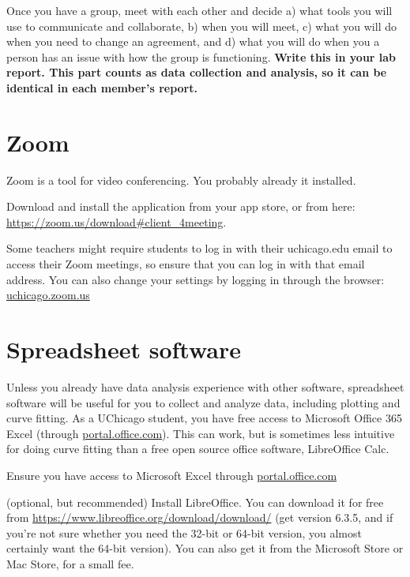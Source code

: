 \begin{steps}
	\item Once you have a group, meet with each other and decide a) what tools you will use to communicate and collaborate, b) when you will meet, c) what you will do when you need to change an agreement, and d) what you will do when you a person has an issue with how the group is functioning. \textbf{Write this in your lab report. This part counts as data collection and analysis, so it can be identical in each member's report.}
\end{steps}

\section{Zoom}

Zoom is a tool for video conferencing. You probably already it installed.

\begin{steps}
	\item Download and install the application from your app store, or from here: \url{https://zoom.us/download\#client_4meeting}.
	
	\item Some teachers might require students to log in with their uchicago.edu email to access their Zoom meetings, so ensure that you can log in with that email address. You can also change your settings by logging in through the browser: \url{uchicago.zoom.us}
\end{steps}

\section{Spreadsheet software}

Unless you already have data analysis experience with other software, spreadsheet software will be useful for you to collect and analyze data, including plotting and curve fitting. As a UChicago student, you have free access to Microsoft Office 365 Excel (through \url{portal.office.com}). This can work, but is sometimes less intuitive for doing curve fitting than a free open source office software, LibreOffice Calc.

\begin{steps}
	\item Ensure you have access to Microsoft Excel through \url{portal.office.com}
	
	\item (optional, but recommended) Install LibreOffice. You can download it for free from \url{https://www.libreoffice.org/download/download/} (get version 6.3.5, and if you're not sure whether you need the 32-bit or 64-bit version, you almost certainly want the 64-bit version). You can also get it from the Microsoft Store or Mac Store, for a small fee.
\end{steps}

